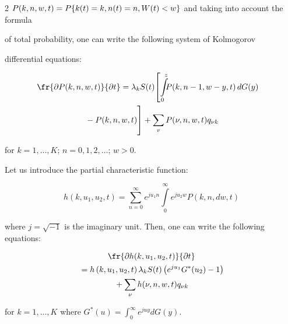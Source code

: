 \begin{multicols}{2}
$P(k,n,w,t)=P\{k(t)\linebreak =k,n(t)=n,W(t)<w\}$ and taking into account the formula 


of total probability, one can write the following system of Kolmogorov 


differential equations:


\begin{multline*}


\hspace*{-9pt}\fr{\partial P(k,n,w,t)}{\partial t}=\lambda_kS(t)\!\left[


\int\limits_0^z\!\!\! P(k,n-1,w-y,t)\,dG(y){}\right.\hspace*{-1pt}\\


\left.{}-P(k,n,w,t)


\vphantom{\int\limits_0^z}\right]


+\sum_vP(\nu,n,w,t)q_{\nu k}


\end{multline*}


for $k=1,\ldots , K$; $n=0,1,2,\ldots$; $w>0$.





Let us introduce the partial characteristic function:


$$


h(k,u_1,u_2,t)=\sum\limits_{n=0}^{\infty}e^{ju_1n}


\int\limits_0^\infty e^{ju_2w}P(k,n,dw,t)


$$


where $j=\sqrt{-1}$ is the imaginary unit. Then, one can write the following equations:


\begin{multline*}


\fr{\partial h(k,u_1,u_2,t)}{\partial t}\\


{}=


h\left(k,u_1,u_2,t\right)\lambda_kS(t)\left( e^{ju_1}G^*(u_2)-1\right) \\


{}+


\sum\limits_{\nu}h(\nu,n,w,t)q_{\nu k}


\end{multline*}


for $k=1,\ldots,K$ where $G^*(u)=\int\nolimits_0^\infty e^{juy}dG(y)$.






\end{multicols}
